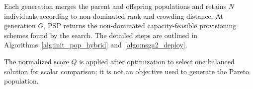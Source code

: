 \documentclass[10pt, conference, letterpaper]{IEEEtran}
\begin{document}
Each generation merges the parent and offspring populations and retains $N$ individuals according to non-dominated rank and crowding distance. At generation $G$, PSP returns the non-dominated capacity-feasible provisioning schemes found by the search. The detailed steps are outlined in Algorithms~\ref{alg:init_pop_hybrid} and~\ref{algo:nsga2_deploy}.


The normalized score $Q$ is applied after optimization to select one balanced solution for scalar comparison; it is not an objective used to generate the Pareto population.




\end{document}
